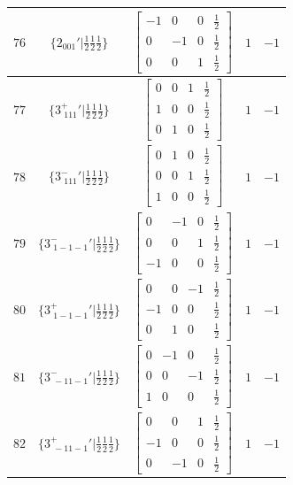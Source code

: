 \documentclass[fleqn,8pt]{jsarticle}
\begin{document}
\begin{longtable}{ccccc}
$ 76 $ & $ \{2{}_{001}{}'|\frac{1}{2} \frac{1}{2} \frac{1}{2}\} $ & $ \begin{bmatrix} -1 & 0 & 0 & \frac{1}{2} \\ 0 & -1 & 0 & \frac{1}{2} \\ 0 & 0 & 1 & \frac{1}{2} \end{bmatrix} $ & $ 1 $ & $ -1 $ \\ \hline
$ 77 $ & $ \{3^{+}_{\,\,111}{}'|\frac{1}{2} \frac{1}{2} \frac{1}{2}\} $ & $ \begin{bmatrix} 0 & 0 & 1 & \frac{1}{2} \\ 1 & 0 & 0 & \frac{1}{2} \\ 0 & 1 & 0 & \frac{1}{2} \end{bmatrix} $ & $ 1 $ & $ -1 $ \\ \hline
$ 78 $ & $ \{3^{-}_{\,\,111}{}'|\frac{1}{2} \frac{1}{2} \frac{1}{2}\} $ & $ \begin{bmatrix} 0 & 1 & 0 & \frac{1}{2} \\ 0 & 0 & 1 & \frac{1}{2} \\ 1 & 0 & 0 & \frac{1}{2} \end{bmatrix} $ & $ 1 $ & $ -1 $ \\ \hline
$ 79 $ & $ \{3^{-}_{\,\,1-1-1}{}'|\frac{1}{2} \frac{1}{2} \frac{1}{2}\} $ & $ \begin{bmatrix} 0 & -1 & 0 & \frac{1}{2} \\ 0 & 0 & 1 & \frac{1}{2} \\ -1 & 0 & 0 & \frac{1}{2} \end{bmatrix} $ & $ 1 $ & $ -1 $ \\ \hline
$ 80 $ & $ \{3^{+}_{\,\,1-1-1}{}'|\frac{1}{2} \frac{1}{2} \frac{1}{2}\} $ & $ \begin{bmatrix} 0 & 0 & -1 & \frac{1}{2} \\ -1 & 0 & 0 & \frac{1}{2} \\ 0 & 1 & 0 & \frac{1}{2} \end{bmatrix} $ & $ 1 $ & $ -1 $ \\ \hline
$ 81 $ & $ \{3^{-}_{\,\,-11-1}{}'|\frac{1}{2} \frac{1}{2} \frac{1}{2}\} $ & $ \begin{bmatrix} 0 & -1 & 0 & \frac{1}{2} \\ 0 & 0 & -1 & \frac{1}{2} \\ 1 & 0 & 0 & \frac{1}{2} \end{bmatrix} $ & $ 1 $ & $ -1 $ \\ \hline
$ 82 $ & $ \{3^{+}_{\,\,-11-1}{}'|\frac{1}{2} \frac{1}{2} \frac{1}{2}\} $ & $ \begin{bmatrix} 0 & 0 & 1 & \frac{1}{2} \\ -1 & 0 & 0 & \frac{1}{2} \\ 0 & -1 & 0 & \frac{1}{2} \end{bmatrix} $ & $ 1 $ & $ -1 $ \\ \hline

\end{longtable}
\end{document}
